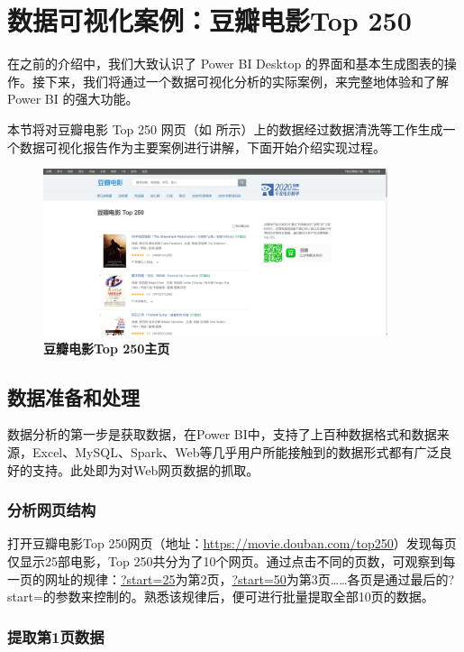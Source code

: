\section{数据可视化案例：豆瓣电影Top 250}

在之前的介绍中，我们大致认识了 Power BI Desktop 的界面和基本生成图表的操作。接下来，我们将通过一个数据可视化分析的实际案例，来完整地体验和了解 Power BI 的强大功能。

本节将对豆瓣电影 Top 250 网页（如 所示）上的数据经过数据清洗等工作生成一个数据可视化报告作为主要案例进行讲解，下面开始介绍实现过程。

\begin{figure}[htbp]
    \centering
    \includegraphics[width=0.9\textwidth]{figure/PowerBI/douban_movie_main_page.png}
    \caption{\textbf{豆瓣电影Top 250主页}}
    \label{fig:douban_movie_main_page}
\end{figure}

\subsection{数据准备和处理}

数据分析的第一步是获取数据，在Power BI中，支持了上百种数据格式和数据来源，Excel、MySQL、Spark、Web等几乎用户所能接触到的数据形式都有广泛良好的支持。此处即为对Web网页数据的抓取。

\subsubsection{分析网页结构}

打开豆瓣电影Top 250网页（地址：\url{https://movie.douban.com/top250}）发现每页仅显示25部电影，Top 250共分为了10个网页。通过点击不同的页数，可观察到每一页的网址的规律：\url{?start=25}为第2页，\url{?start=50}为第3页……各页是通过最后的?start=的参数来控制的。熟悉该规律后，便可进行批量提取全部10页的数据。

\subsubsection{提取第1页数据}

